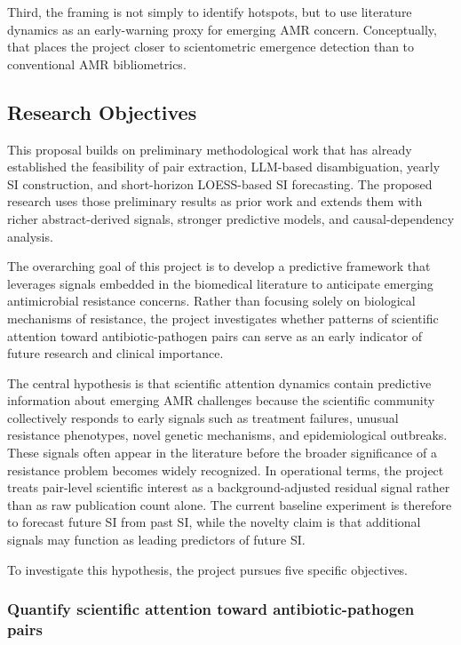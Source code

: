 \documentclass[
]{article}
\begin{document}
Third, the framing is not simply to identify hotspots, but to use
literature dynamics as an early-warning proxy for emerging AMR concern.
Conceptually, that places the project closer to scientometric emergence
detection than to conventional AMR bibliometrics.


\subsection{Research Objectives}\label{research-objectives}

This proposal builds on preliminary methodological work that has
already established the feasibility of pair extraction, LLM-based
disambiguation, yearly SI construction, and short-horizon LOESS-based
SI forecasting. The proposed research uses those preliminary results as
prior work and extends them with richer abstract-derived signals,
stronger predictive models, and causal-dependency analysis.

The overarching goal of this project is to develop a predictive
framework that leverages signals embedded in the biomedical literature
to anticipate emerging antimicrobial resistance concerns. Rather than
focusing solely on biological mechanisms of resistance, the project
investigates whether patterns of scientific attention toward
antibiotic-pathogen pairs can serve as an early indicator of future
research and clinical importance.

The central hypothesis is that scientific attention dynamics contain
predictive information about emerging AMR challenges because the
scientific community collectively responds to early signals such as
treatment failures, unusual resistance phenotypes, novel genetic
mechanisms, and epidemiological outbreaks. These signals often appear in
the literature before the broader significance of a resistance problem
becomes widely recognized. In operational terms, the project treats
pair-level scientific interest as a background-adjusted residual signal
rather than as raw publication count alone. The current baseline
experiment is therefore to forecast future SI from past SI, while the
novelty claim is that additional signals may function as leading
predictors of future SI.

To investigate this hypothesis, the project pursues five specific
objectives.

\subsubsection{Quantify scientific attention toward
antibiotic-pathogen
pairs}\label{objective-1-quantify-scientific-attention-toward-antibiotic-pathogen-pairs}
\end{document}
